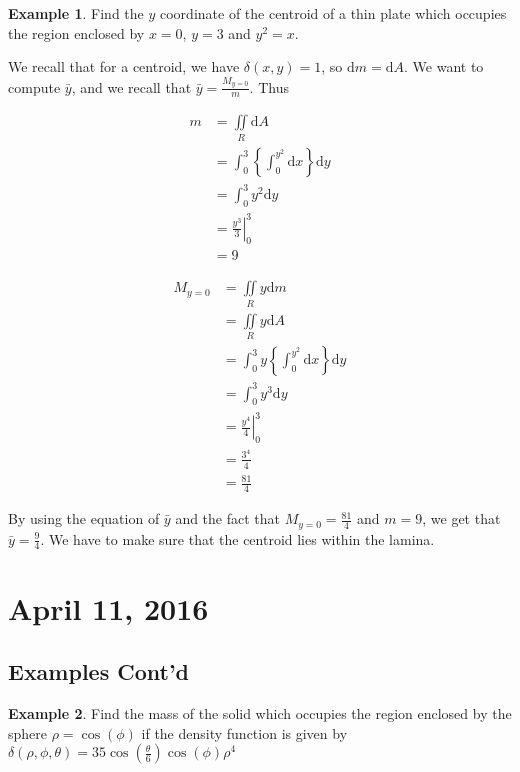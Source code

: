 \documentclass[11pt]{article}
\theoremstyle{plain} %
\theoremstyle{definition}
\theoremstyle{example}
\newtheorem*{example}{Example}
\theoremstyle{remark}
\begin{document}
\begin{example}
Find the $y$ coordinate of the centroid of a thin plate which occupies the region enclosed by $x=0$, $y=3$ and $y^2 = x$.
\end{example}

We recall that for a centroid, we have $\delta(x,y) = 1$, so $\mathrm d m = \mathrm d A$. We want to compute $\bar{y}$, and we recall that $\bar{y} = \frac{M_{y=0}}{m}$. Thus

\begin{align*}
	m &= \iint \limits_R \mathrm d A\\
	&= \int_0^3 \left\{ \int_0^{y^2} \mathrm d x \right\} \mathrm d y \\
	&= \int_0^3 y^2 \mathrm d y \\
	&= \left.\frac{y^3}{3}\right|_0^3\\
	&= 9
\end{align*}

\begin{align*}
	M_{y=0} &= \iint \limits_R y\mathrm d m\\
	&= \iint \limits_R y\mathrm d A\\
	&= \int_0^3y\left\{\int_0^{y^2}\mathrm d x\right\}\mathrm d y\\
	&= \int_0^3y^3\mathrm d y\\
	&= \left.\frac{y^4}{4}\right|_0^3\\
	&= \frac{3^4}{4}\\
	&= \frac{81}{4}
\end{align*}

By using the equation of $\bar{y}$ and the fact that $M_{y=0} = \frac{81}{4}$ and $m=9$, we get that $\bar{y} = \frac{9}{4}$. We have to make sure that the centroid lies within the lamina. 

\section{April 11, 2016}

\subsection{Examples Cont'd}

\begin{example}
Find the mass of the solid which occupies the region enclosed by the sphere $\rho = \cos(\phi)$ if the density function is given by $\delta(\rho, \phi, \theta) = 35 \cos(\frac{\theta}{6})\cos(\phi)\rho^4$
\end{example}
\end{document}
